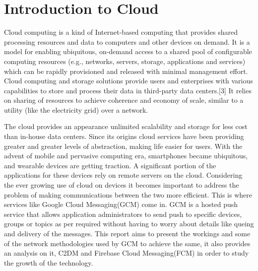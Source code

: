 \section{Introduction to Cloud}
Cloud computing is a kind of Internet-based computing that provides shared processing resources and data to computers and other devices on demand. It is a model for enabling ubiquitous, on-demand access to a shared pool of configurable computing resources (e.g., networks, servers, storage, applications and services)\cite{dcc}\cite{4} which can be rapidly provisioned and released with minimal management effort. Cloud computing and storage solutions provide users and enterprises with various capabilities to store and process their data in third-party data centers.[3] It relies on sharing of resources to achieve coherence and economy of scale, similar to a utility (like the electricity grid) over a network.\cite{ccwiki}

The cloud provides an appearance unlimited scalability and storage for less cost than in-house data centers. Since its origins cloud services have been providing greater and greater levels of abstraction, making life easier for users. With the advent of mobile and pervasive computing era,
smartphones became ubiquitous, and wearable devices are
getting traction. A significant portion of the applications for
these devices rely on remote servers on the cloud. Considering the ever growing use of cloud on devices it becomes important to address the problem of making communications between the two more efficient. This is where services like Google Cloud Messaging(GCM) come in. GCM is a hosted push service that allows application administrators to send push to specific devices, groups or topics as per required without having to worry about details like queing and delivery of the messages. This report aims to present the workings and some of the network methodologies used by GCM to achieve the same, it also provides an analysis on it, C2DM and Firebase Cloud Messaging(FCM) in order to study the growth of the technology.
